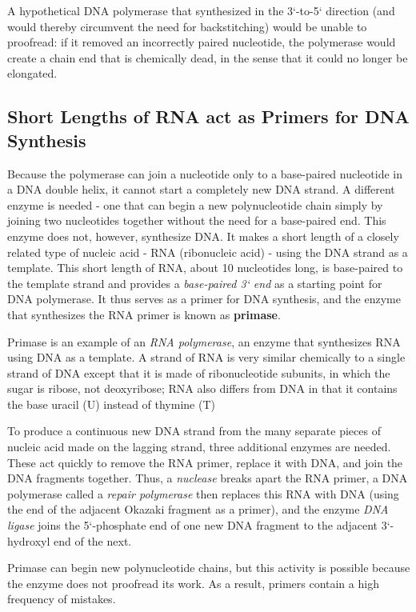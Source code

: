 A hypothetical DNA polymerase that synthesized in the
3`-to-5` direction (and would thereby circumvent the need for backstitching)
would be unable to proofread: if it removed an incorrectly paired
nucleotide, the polymerase would create a chain end that is chemically
dead, in the sense that it could no longer be elongated.

\subsection{Short Lengths of RNA act as Primers for DNA Synthesis}

Because the polymerase can join a nucleotide
only to a base-paired nucleotide in a DNA double helix, it cannot start
a completely new DNA strand. A different enzyme is needed - one that
can begin a new polynucleotide chain simply by joining two nucleotides
together without the need for a base-paired end. This enzyme does not,
however, synthesize DNA. It makes a short length of a closely related type
of nucleic acid - RNA (ribonucleic acid) - using the DNA strand as a template.
This short length of RNA, about 10 nucleotides long, is base-paired
to the template strand and provides a \textit{base-paired 3` end} as a starting
point for DNA polymerase. It thus serves as a primer for DNA synthesis,
and the enzyme that synthesizes the RNA primer is known as \textbf{primase}.

Primase is an example of an \textit{RNA polymerase}, an enzyme that synthesizes
RNA using DNA as a template. A strand of RNA is very similar chemically
to a single strand of DNA except that it is made of ribonucleotide
subunits, in which the sugar is ribose, not deoxyribose; RNA also differs
from DNA in that it contains the base uracil (U) instead of thymine (T)

To produce a continuous new DNA strand from the many separate pieces
of nucleic acid made on the lagging strand, three additional enzymes are
needed. These act quickly to remove the RNA primer, replace it with DNA,
and join the DNA fragments together. Thus, a \textit{nuclease} breaks apart the
RNA primer, a DNA polymerase called a \textit{repair polymerase} then replaces
this RNA with DNA (using the end of the adjacent Okazaki fragment as
a primer), and the enzyme \textit{DNA ligase} joins the 5`-phosphate end of one
new DNA fragment to the adjacent 3`-hydroxyl end of the next.

Primase can begin new polynucleotide chains, but this activity is possible
because the enzyme does not proofread its work. As a result, primers
contain a high frequency of mistakes.

